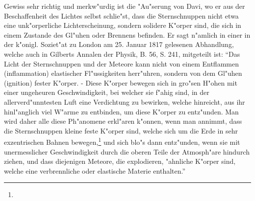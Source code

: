 \documentclass[a4paper, 11pt, oneside, polutonikogreek, german]{article}
\begin{document}
Gewiss sehr richtig und merkw"urdig ist die "Au"serung von Davi, wo er aus der Beschaffenheit des Lichtes selbst schlie"st, dass die Sternschnuppen nicht etwa eine unk"orperliche Lichterscheinung, sondern solidere K"orper sind, die sich in einem Zustande des Gl"uhen oder Brennens befinden. Er sagt n"amlich in einer in der k"onigl. Soziet"at zu London am 25. Januar 1817 gelesenen Abhandlung, welche auch in Gilberts Annalen der Physik, B. 56, S. 241, mitgeteilt ist: "`Das Licht der Sternschnuppen und der Meteore kann nicht von einem Entflammen (inflammation) elastischer Fl"ussigkeiten herr"uhren, sondern von dem Gl"uhen (ignition) fester K"orper. - Diese K"orper bewegen sich in gro"sen H"ohen mit einer ungeheuren Geschwindigkeit, bei welcher sie f"ahig sind, in der allerverd"unntesten Luft eine Verdichtung zu bewirken, welche hinreicht, aus ihr hinl"anglich viel W"arme zu entbinden, um diese K"orper zu entz"unden. Man wird daher alle diese Ph"anomene erkl"aren k"onnen, wenn man annimmt, dass die Sternschnuppen kleine feste K"orper sind, welche sich um die Erde in sehr exzentrischen Bahnen bewegen,\footnote{} und sich blo"s dann entz"unden, wenn sie mit unermesslicher Geschwindigkeit durch die oberen Teile der Atmosph"are hindurch ziehen, und dass diejenigen Meteore, die explodieren, "ahnliche K"orper sind, welche eine verbrennliche oder elastische Materie enthalten."'
\end{document}
